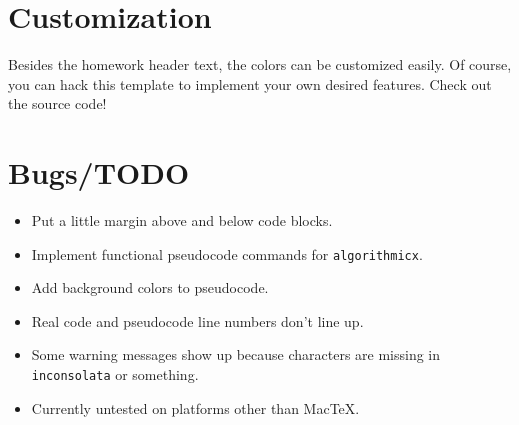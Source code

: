 \documentclass{article}
\theoremstyle{plain}
\theoremstyle{definition}
\theoremstyle{remark}
\begin{document}
\section{Customization}

Besides the homework header text, the colors can be customized easily. Of course, you can hack this template to implement your own desired features. Check out the source code!

\section{Bugs/TODO}

\begin{itemize}
  \item Put a little margin above and below code blocks.
  \item Implement functional pseudocode commands for \texttt{algorithmicx}.
  \item Add background colors to pseudocode.
  \item Real code and pseudocode line numbers don't line up.
  \item Some warning messages show up because characters are missing in \texttt{inconsolata} or something.
  \item Currently untested on platforms other than MacTeX.
\end{itemize}
\end{document}
